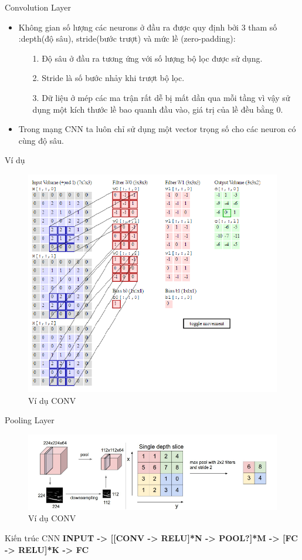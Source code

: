 \documentclass[compress]{beamer}
\begin{document}
\begin{frame}{Convolution Layer}
\begin{itemize}
\item	Không gian số lượng các neurons ở đầu ra được quy định bởi 3 tham số :depth(độ sâu), stride(bước trượt) và mức lề (zero-padding):
\begin{itemize}
\item[1. ] Độ sâu ở đầu ra tương ứng với số lượng bộ lọc được sử dụng.
\item[2. ] Stride là số bước nhảy khi trượt bộ lọc.
\item[3. ] Dữ liệu ở mép các ma trận rất dễ bị mất  dần qua mỗi tầng vì vậy sử dụng một kích thước lề bao quanh đầu vào, giá trị của lề đều bằng 0. 

\end{itemize} 
\item Trong mạng CNN ta luôn chỉ sử dụng một vector trọng số cho các neuron có cùng độ sâu.
\end{itemize}
\end{frame}
\begin{frame}{Ví dụ}
\begin{figure}[H]
\includegraphics[scale=0.5]{img3.png}
\caption{Ví dụ CONV}
\end{figure}
\end{frame}
\begin{frame}{Pooling Layer}
\begin{figure}[H]
\includegraphics[scale=0.5]{img4.png}
\caption{Ví dụ CONV}
\end{figure}
\end{frame}
\begin{frame}{Kiến trúc CNN}
\small{
\textbf{INPUT -> [[CONV -> RELU]*N -> POOL?]*M -> [FC -> RELU]*K -> FC}
}

\end{frame}
\end{document}
